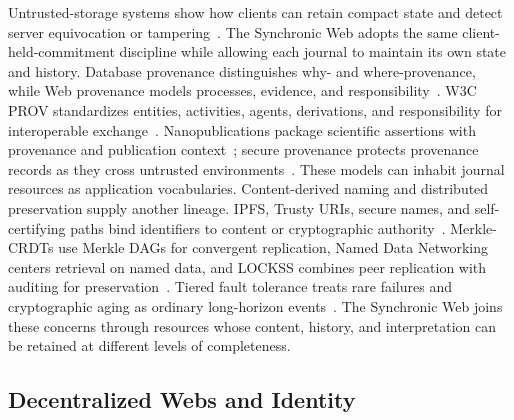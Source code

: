 Untrusted-storage systems show how clients can retain compact state and detect server equivocation or tampering~\cite{Li2004secure,Mahajan2010depot,Kim2015caelus}. The Synchronic Web adopts the same client-held-commitment discipline while allowing each journal to maintain its own state and history. Database provenance distinguishes why- and where-provenance, while Web provenance models processes, evidence, and responsibility~\cite{Buneman2001why,Moreau2010foundations,Moreau2010open}. W3C PROV standardizes entities, activities, agents, derivations, and responsibility for interoperable exchange~\cite{Moreau2013prov}. Nanopublications package scientific assertions with provenance and publication context~\cite{Groth2010anatomy}; secure provenance protects provenance records as they cross untrusted environments~\cite{Hasan2009provenance}. These models can inhabit journal resources as application vocabularies. Content-derived naming and distributed preservation supply another lineage. IPFS, Trusty URIs, secure names, and self-certifying paths bind identifiers to content or cryptographic authority~\cite{Benet2014ipfs,Kuhn2014trusty,Haber1997secure,Mazieres1998path}. Merkle-CRDTs use Merkle DAGs for convergent replication, Named Data Networking centers retrieval on named data, and LOCKSS combines peer replication with auditing for preservation~\cite{Sanjuan2020merkle,Zhang2014named,Maniatis2005lockss}. Tiered fault tolerance treats rare failures and cryptographic aging as ordinary long-horizon events~\cite{Chun2009tiered}. The Synchronic Web joins these concerns through resources whose content, history, and interpretation can be retained at different levels of completeness.

\subsection{Decentralized Webs and Identity}

